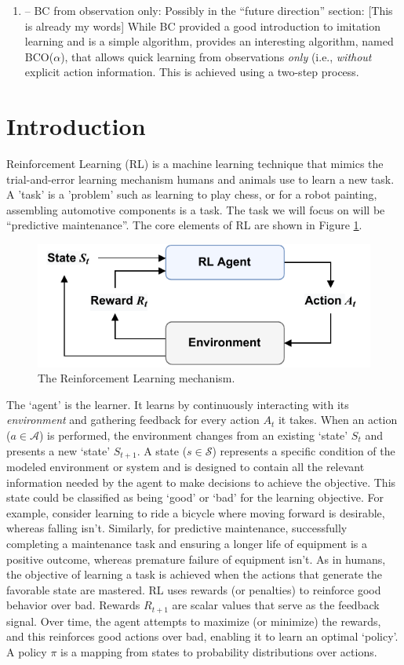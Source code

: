 \documentclass{article}
\begin{document}
\begin{enumerate}
    \item \cite{torabi2018BCO} -- BC from observation only: Possibly in the ``future direction'' section: [This is already my words] While BC provided a good introduction to imitation learning and is a simple algorithm, \cite{torabi2018BCO} provides an interesting algorithm, named BCO($\alpha$), that allows quick learning from observations \textit{only} (i.e., \textit{without} explicit action information. This is achieved using a two-step process.
\end{enumerate}

\section{Introduction}
Reinforcement Learning (RL) is a machine learning technique that mimics the trial-and-error learning mechanism humans and animals use to learn a new task. A 'task' is a 'problem' such as learning to play chess, or for a robot painting, assembling automotive components is a task. The task we will focus on will be ``predictive maintenance''. The core elements of RL are shown in Figure \ref{fig:RL}.
\begin{figure}[h]
    \centering
    \includegraphics[width=0.5\linewidth]{images/RL-loop.pdf}
    \caption{The Reinforcement Learning mechanism.}
    \label{fig:RL}
\end{figure}

The `agent' is the learner. It learns by continuously interacting with its \textit{environment} and gathering feedback for every action $A_t$ it takes. When an action ($a\in \mathcal{A}$) is performed, the environment changes from an existing `state' $S_t$ and presents a new `state' $S_{t+1}$. A state ($s\in \mathcal{S}$) represents a specific condition of the modeled environment or system and is designed to contain all the relevant information needed by the agent to make decisions to achieve the objective. This state could be classified as being `good' or `bad' for the learning objective. For example, consider learning to ride a bicycle where moving forward is desirable, whereas falling isn't. Similarly, for predictive maintenance, successfully completing a maintenance task and ensuring a longer life of equipment is a positive outcome, whereas premature failure of equipment isn't. As in humans, the objective of learning a task is achieved when the actions that generate the favorable state are mastered. RL uses rewards (or penalties) to reinforce good behavior over bad. Rewards $R_{t+1}$ are scalar values that serve as the feedback signal. Over time, the agent attempts to maximize (or minimize) the rewards, and this reinforces good actions over bad, enabling it to learn an optimal `policy'. A policy $\pi$ is a mapping from states to probability distributions over actions.
\end{document}
